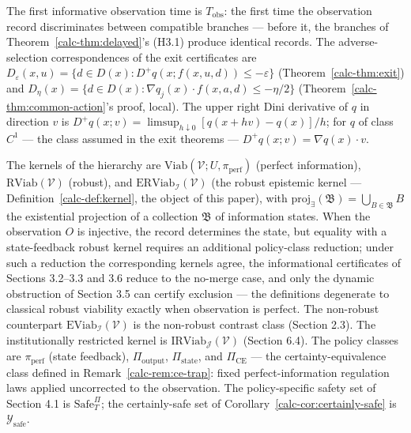\documentclass[10pt,twocolumn]{article}
\theoremstyle{definition}
\begin{document}
The first informative observation
time is \(T_{\mathrm{obs}}\): the first time the observation record
discriminates between compatible branches --- before it, the branches of
Theorem~\ref{calc-thm:delayed}'s (H3.1) produce identical records. The adverse-selection
correspondences of the exit certificates are
\(D_{\varepsilon}(x,u) = \{ d \in D(x) : D^+ q(x; f(x,u,d)) \le -\varepsilon \}\)
(Theorem~\ref{calc-thm:exit}) and
\(D_{\eta}(x) = \{ d \in D(x) : \nabla q_j(x) \cdot f(x, a, d) \le -\eta/2 \}\)
(Theorem~\ref{calc-thm:common-action}'s proof, local). The upper
right Dini derivative of \(q\) in direction \(v\) is
\(D^+ q(x; v) = \limsup_{h \downarrow 0} [q(x + hv) - q(x)]/h\); for
\(q\) of class \(C^1\) --- the class assumed in the exit theorems ---
\(D^+ q(x; v) = \nabla q(x) \cdot v\).

The kernels of the hierarchy are
\(\mathrm{Viab}(\mathcal{V}; U, \pi_{\mathrm{perf}})\) (perfect
information), \(\mathrm{RViab}(\mathcal{V})\) (robust), and
\(\mathrm{ERViab}_{\mathcal{I}}(\mathcal{V})\) (the robust epistemic
kernel --- Definition~\ref{calc-def:kernel}, the object of this paper), with
\(\mathrm{proj}_{\exists}(\mathfrak{B}) = \bigcup_{B \in \mathfrak{B}} B\)
the existential projection of a collection \(\mathfrak{B}\) of information states. When the observation \(O\) is injective, the record determines the state, but equality with a state-feedback robust kernel requires an additional policy-class reduction; under such a reduction the corresponding kernels agree, the informational certificates of Sections 3.2--3.3 and 3.6 reduce to the no-merge case, and only the dynamic obstruction of Section 3.5 can certify exclusion --- the definitions degenerate to classical robust viability exactly when observation is perfect. The non-robust counterpart
\(\mathrm{EViab}_{\mathcal{I}}(\mathcal{V})\) is the non-robust contrast class (Section 2.3). The institutionally restricted kernel is \(\mathrm{IRViab}_{\mathcal{J}}(\mathcal{V})\) (Section 6.4). The policy classes
are \(\pi_{\mathrm{perf}}\) (state feedback), \(\Pi_{\mathrm{output}}\),
\(\Pi_{\mathrm{state}}\), and \(\Pi_{\mathrm{CE}}\) --- the
certainty-equivalence class defined in Remark~\ref{calc-rem:ce-trap}: fixed
perfect-information regulation laws applied uncorrected to the
observation. The policy-specific safety set of Section 4.1 is
\(\mathrm{Safe}^{\Pi}_T\); the certainly-safe set of Corollary~\ref{calc-cor:certainly-safe} is
\(\mathcal{Y}_{\mathrm{safe}}\).
\end{document}
